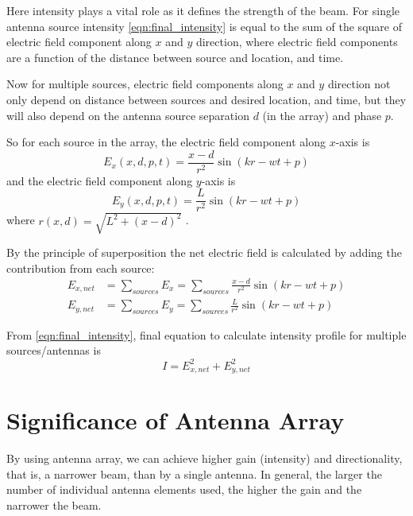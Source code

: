 Here intensity plays a vital role as it defines the strength of the beam. For single antenna source intensity \eqref{eqn:final_intensity} is equal to the sum of the square of electric field component along $x$ and $y$ direction, where electric field components are a function of the distance between source and location, and time.

Now for multiple sources, electric field components along $x$ and $y$ direction not only depend on distance between sources and desired location, and time, but they will also depend on the antenna source separation $d$ (in the array) and phase $p$.

So for each source in the array, the electric field component along $x$-axis is
%
\begin{equation}
{E}_x(x,d,p,t) = \frac{x-d}{r^2}\sin(kr-wt+p)
\end{equation}
%
and the electric field component along $y$-axis is
%
\begin{equation}
{E}_y(x,d,p,t) = \frac{L}{r^2}\sin(kr-wt+p)
\end{equation}
%
where $r(x,d) = \sqrt{L^2+(x-d)^2}$ .

By the principle of superposition the net electric field is calculated by adding the contribution from each source:
%
\begin{equation}
   \begin{aligned}
      E_{x,net} &= \sum_{sources} E_x = \sum_{sources} \frac{x-d}{r^2}\sin(kr-wt+p)\\
      E_{y,net} &= \sum_{sources} E_y = \sum_{sources} \frac{L}{r^2}\sin(kr-wt+p)
   \end{aligned}
\end{equation}

From \eqref{eqn:final_intensity}, final equation to calculate intensity profile for multiple sources/antennas is
%
\begin{equation}
   I = E^2_{x,net} + E^2_{y,net}
\end{equation}


\section{Significance of Antenna Array}

By using antenna array, we can achieve higher gain (intensity) and directionality, that is, a narrower beam, than by a single antenna. In general, the larger the number of individual antenna elements used, the higher the gain and the narrower the beam.

